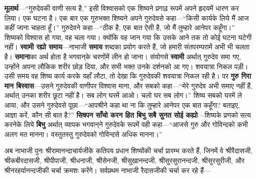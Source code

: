 \begin{sloppypar}\justifying{}
\textbf{मूलार्थ}—“गुरुदेवकी वाणी सत्य है,” इसी विश्वासको एक शिष्यने प्रगाढ़ रूपमें अपने हृदयमें धारण कर लिया। एक घटना है। एक बार एक गुरुभक्त शिष्यने अपने गुरुदेवसे कहा—“किसी कार्यके लिये मैं आज कहीं जाना चाहता हूँ।” गुरुदेवने कहा—“ठीक है, एक बात ऐसी है, जो मैं तुम्हारे आनेपर कहूँगा।” शिष्यको विश्वास हो गया, वह चला गया। क्योंकि वह जान गया कि उसके आने तक तो कोई घटना घटेगी नहीं। \textbf{स्वामी रह्यो समाय}—नाभाजी \textbf{समाय} शब्दका प्रयोग करते हैं, जो हमारी संत\-परम्परामें अभी भी चलता है। \textbf{समाना}का अर्थ होता है भगवान्‌के चरणोंमें लीन हो जाना। संयोगसे \textbf{स्वामी} अर्थात् गुरुदेव समा गए, उन्होंने अपना लौकिक शरीर छोड़ दिया, और सभी भक्त उनके दर्शनको आ गए। शवयात्रा निकल पड़ी। उसी समय वह शिष्य कार्य करके यहाँ लौटा, तो देखा कि गुरुदेवकी शवयात्रा निकल रही है। पर \textbf{गुरु गिरा मान बिस्वास}—उसने गुरुदेवकी वाणीपर विश्वास माना, और सबको कहा—“मेरे गुरुदेव अभी समाए नहीं हैं, अर्थात् उनका शरीर छूटा नहीं है। सब लोग घरमें आओ। चलो घर सब लोग।” शिष्य सबको घरमें ले आया, और उसने गुरुदेवसे पूछा—“आपश्रीने कहा था ना कि तुम्हारे आनेपर एक बात कहूँगा? बताइए, आज्ञा करें, कौन सी बात है?” \textbf{सिषपन साँचो करन हित बिभु सबै सुनत सोई कह्यो}—शिष्यके प्रणको सत्य करनेके लिये \textbf{बिभु} अर्थात् व्यापक भगवान्‌ने गुरुदेवके रूपमें वही कहा—“आजसे गुरु और गोविन्दको कभी अलग मत मानना। वस्तुतस्तु गुरुदेवको गोविन्दसे अधिक मानना।”
\end{sloppypar}
\begin{sloppypar}\justifying{}
अब नाभाजी पुनः श्रीरामानन्दाचार्यजीके कतिपय प्रधान शिष्योंकी चर्चा प्रारम्भ करते हैं, जिनमें वे श्रीरैदासजी, श्रीकबीरदासजी, श्रीपीपाजी, श्रीधनाजी, श्रीसेनजी, श्रीसुखानन्दजी, श्रीसुरसुरानन्दजी, श्रीसुरसुरीजी, और श्रीनरहर्यानन्दजीकी चर्चा क्रमशः करेंगे। सर्वप्रथम नाभाजी रैदासजीकी चर्चा कर रहे हैं—
\end{sloppypar}


